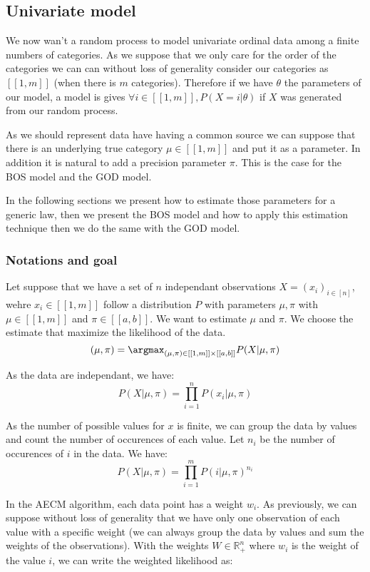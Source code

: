 \subsection{Univariate model}
\label{sec:univariate}

We now wan't a random process to model univariate ordinal data among a finite numbers of categories.
As we suppose that we only care for the order of the categories we can can without loss of generality consider our categories as $[[1, m]]$ (when there is $m$ categories). Therefore if we have $\theta$ the parameters of our model, a model is gives $\forall i \in [[1, m]], P(X = i | \theta)$ if $X$ was generated from our random process. 

As we should represent data have having a common source we can suppose that there is an underlying true category $\mu \in [[1, m]]$ and put it as a parameter. In addition it is natural to add a precision parameter $\pi$. This is the case for the BOS model and the GOD model. 

In the following sections we present how to estimate those parameters for a generic law, then we present the BOS model and how to apply this estimation technique then we do the same with the GOD model.


\subsubsection{Notations and goal}

Let suppose that we have a set of $n$ independant observations $X = (x_i)_{i \in [n]}$, wehre $x_i \in [[1, m]]$ follow a distribution $P$ with parameters $\mu, \pi$ with $\mu \in [[1, m]]$ and $\pi \in [[a, b]]$. We want to estimate $\mu$ and $\pi$. We choose the estimate that maximize the likelihood of the data.
$$(\mu, \pi) = \argmax_{(\mu, \pi) \in [[1, m]] \times [[a, b]]} P(X | \mu, \pi)$$

As the data are independant, we have:
$$P(X | \mu, \pi) = \prod_{i=1}^n P(x_i | \mu, \pi)$$

As the number of possible values for $x$ is finite, we can group the data by values and count the number of occurences of each value. Let $n_i$ be the number of occurences of $i$ in the data. We have:
$$P(X | \mu, \pi) = \prod_{i=1}^m P(i | \mu, \pi)^{n_i}$$

In the AECM algorithm, each data point has a weight $w_i$. As previously, we can suppose without loss of generality that we have only one observation of each value with a specific weight (we can always group the data by values and sum the weights of the observations). With the weights $W \in \mathbb{R}_+^n$ where $w_i$ is the weight of the value $i$, we can write the weighted likelihood as:

